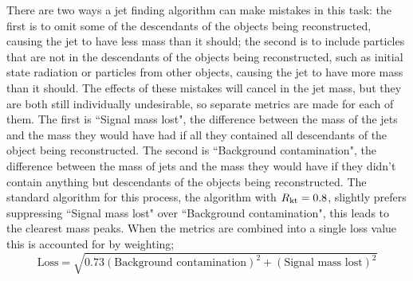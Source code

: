 There are two ways a jet finding algorithm can make mistakes in this task:
the first is to omit some of the descendants of the objects being reconstructed, causing the jet to have less mass than it should;
the second is to include particles that are not in the descendants of the objects being reconstructed, such as initial state radiation or particles from other objects,
causing the jet to have more mass than it should.
The effects of these mistakes will cancel in the jet mass,
but they are both still individually undesirable,
so separate metrics are made for each of them.
The first is ``Signal mass lost", the difference between the mass of the jets and the mass they would have had if all they contained all descendants of the object being reconstructed.
The second is ``Background contamination", the difference between the mass of jets and the mass they would have if they didn't contain anything but descendants of the objects being reconstructed.
The standard algorithm for this process, the \antikt{} algorithm with \(R{}_\text{kt}=0.8\), slightly prefers suppressing ``Signal mass lost" over ``Background contamination",
this leads to the clearest mass peaks.
When the metrics are combined into a single loss value this is accounted for by weighting;
\begin{equation}\label{eqn:loss}
\text{Loss} = \sqrt{0.73(\text{Background contamination})^2 + (\text{Signal mass lost})^2}
\end{equation}

